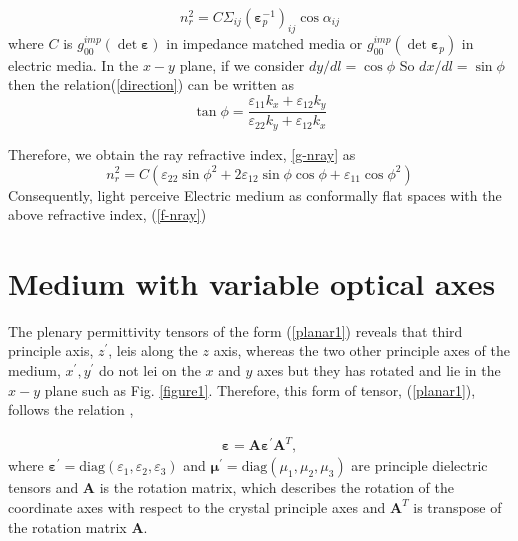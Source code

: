 \documentclass[9pt,twocolumn,twoside]{osajnl}
\begin{document}
\begin{equation}\label{g-nray}
n_{r}^{2}=C\Sigma_{ij} (\boldsymbol{\varepsilon}_{p}^{-1})_{ij}\cos{\alpha}_{ij}
\end{equation}
where $C$ is $g^{imp}_{00}(\det{\boldsymbol{\varepsilon}})$ in impedance matched media or $g^{imp}_{00}(\det{\boldsymbol{\varepsilon}_{p}})$ in electric media. In the $x-y$ plane, if we consider $dy/dl=\cos{\phi}$ So $dx/dl=\sin{\phi}$ then the relation(\ref{direction}) can be written as
\begin{equation}
\tan{\phi}=\dfrac{\varepsilon_{11}k_{x}+\varepsilon_{12}k_{y}}{\varepsilon_{22}k_{y}+\varepsilon_{12}k_{x}}
\end{equation}

Therefore, we obtain the ray refractive index, \ref{g-nray} as
\begin{equation}\label{f-nray}
n_{r}^{2}=C(\varepsilon_{22}\sin{\phi}^{2} +2\varepsilon_{12}\sin{\phi}\cos{\phi} +\varepsilon_{11}\cos{\phi}^{2})
\end{equation}
Consequently, light  perceive Electric medium as conformally flat spaces with the above refractive index, (\ref{f-nray})

\section{Medium with variable optical axes}

The plenary permittivity tensors of the form (\ref{planar1}) reveals that third principle axis, $z^{\prime}$, leis along the $z$ axis, whereas the two other principle axes of the medium, $x^{\prime}, y^{\prime}$ do not lei on the $x$ and $y$ axes but they has rotated and lie in the $x-y$ plane such as Fig. \ref{figure1}. Therefore, this form of tensor, (\ref{planar1}), follows the relation \cite{yeh1980optics},

 \begin{eqnarray}\label{t.t}
        \boldsymbol{\varepsilon}= \mathbf{A} \boldsymbol{\varepsilon^{\prime}}\mathbf{A}^{T},
        \end{eqnarray}
where $ \boldsymbol{\varepsilon^{\prime}} = \mbox{diag} (\varepsilon_{1},\varepsilon_{2},\varepsilon_{3})$ and $\boldsymbol{\mu^{\prime}} = \mathrm{diag} (\mu_{1},\mu_{2},\mu_{3}) $  are  principle dielectric tensors and $\mathbf{A}$  is the rotation matrix, which describes the rotation of the coordinate axes with respect to the crystal principle axes and $ \mathbf{A}^{T}$ is transpose of the rotation matrix $ \mathbf{A}$. 
\end{document}
